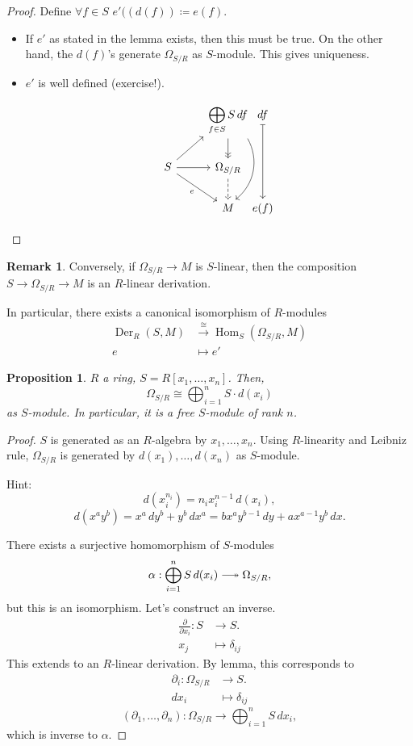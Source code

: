 \documentclass[12pt]{article}
\DeclareMathOperator{\Hom}{Hom}
\DeclareMathOperator{\Der}{Der}
\newtheorem*{proposition}{Proposition}
\theoremstyle{definition}
\newtheorem*{remark}{Remark}
\begin{document}
\begin{proof}
Define $\forall f\in S$ $e'((d(f))\coloneqq e(f)$.

\begin{itemize}[label=$-$]
\item If $e'$ as stated in the lemma exists, then this must be true. On the other hand, the $d(f)$'s generate $\Omega_{S/R}$ as $S$-module. This gives uniqueness.

\item $e'$ is well defined (exercise!).

\[\begin{tikzcd}&\displaystyle{\bigoplus_{f\in S}S\,df}\arrow[->>,d]\arrow[dd,bend left=40,looseness=1]&[-1cm]df\arrow[|->,dd]\\S\arrow[ru]\arrow[r]\arrow[rd,"e",swap]&\Omega_{S/R}\arrow[d,dashed]\\&M&e(f)\end{tikzcd}\]
\end{itemize}
\end{proof}

\begin{remark}
Conversely, if $\Omega_{S/R}\rightarrow M$ is $S$-linear, then the composition $S\rightarrow\Omega_{S/R}\rightarrow M$ is an $R$-linear derivation.

In particular, there exists a canonical isomorphism of $R$-modules
\begin{align*}
\Der_R(S,M)&\overset\cong\longrightarrow\Hom_S(\Omega_{S/R},M)\\e&\longmapsto e'
\end{align*}
\end{remark}

\begin{proposition}
$R$ a ring, $S=R[x_1,\ldots,x_n]$. Then,
\[\Omega_{S/R}\cong\bigoplus_{i=1}^nS\cdot d(x_i)\]
as $S$-module. In particular, it is a free $S$-module of rank $n$.
\end{proposition}

\begin{proof}
$S$ is generated as an $R$-algebra by $x_1,\ldots,x_n$. Using $R$-linearity and Leibniz rule, $\Omega_{S/R}$ is generated by $d(x_1),\ldots,d(x_n)$ as $S$-module.

Hint:
\[d(x_i^{n_i})=n_ix_i^{n-1}\,d(x_i),\]
\[d(x^ay^b)=x^a\,dy^b+y^b\,dx^a=bx^ay^{b-1}\,dy+ax^{a-1}y^b\,dx.\]

There exists a surjective homomorphism of $S$-modules
\[\alpha:\bigoplus_{i=1}^nS\,d(x_i)\relbar\joinrel\twoheadrightarrow\Omega_{S/R},\]
but this is an isomorphism. Let's construct an inverse.
\begin{align*}
\frac\partial{\partial x_i}:S&\longrightarrow S.\\x_j&\longmapsto\delta_{ij}
\end{align*}
This extends to an $R$-linear derivation. By lemma, this corresponds to
\begin{align*}
\partial_i:\Omega_{S/R}&\longrightarrow S.\\dx_i&\longmapsto\delta_{ij}
\end{align*}
\[(\partial_1,\ldots,\partial_n):\Omega_{S/R}\longrightarrow\bigoplus_{i=1}^nS\,dx_i,\]
which is inverse to $\alpha$.
\end{proof}
\end{document}
